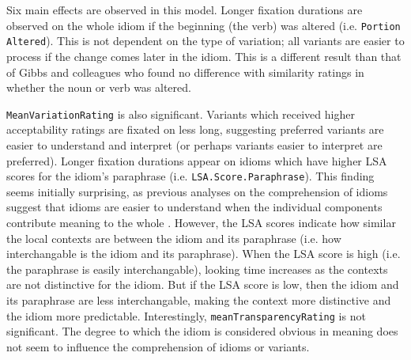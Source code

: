 \documentclass[output=paper,modfonts,nonflat]{langsci/langscibook}
\begin{document}



Six main effects are observed in this model. Longer fixation durations are observed on the whole idiom if the beginning (the verb) was altered (i.e. \texttt{Portion Altered}). This is not dependent on the type of variation; all variants are easier to process if the change comes later in the idiom. This is a different result than that of Gibbs and colleagues \citep{GibbsEtAl1989, GibbsNayak1989} who found no difference with similarity ratings in whether the noun or verb was altered. %

\texttt{MeanVariationRating} is also significant. Variants which received higher acceptability ratings are fixated on less long, suggesting preferred variants are easier to understand and interpret (or perhaps variants easier to interpret are preferred). Longer fixation durations appear on idioms which have higher LSA scores for the idiom's paraphrase (i.e. \texttt{LSA.Score.Paraphrase}). This finding seems initially surprising, as previous analyses on the comprehension of idioms suggest that idioms are easier to understand when the individual components contribute meaning to the whole \citep{GibbsEtAl1989}. However, the LSA scores indicate how similar the local contexts are between the idiom and its paraphrase (i.e. how interchangable is the idiom and its paraphrase). When the LSA score is high (i.e. the paraphrase is easily interchangable), looking time increases as the contexts are not distinctive for the idiom. But if the LSA score is low, then the idiom and its paraphrase are less interchangable, making the context more distinctive and the idiom more predictable. Interestingly, \texttt{meanTransparencyRating} is not significant. The degree to which the idiom is considered obvious in meaning does not seem to influence the comprehension of idioms or variants. %
\end{document}

